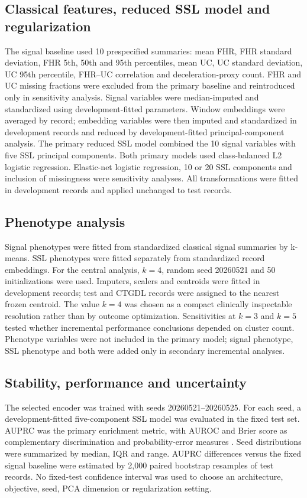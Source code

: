 \documentclass[utf8]{FrontiersinHarvard}
\begin{document}
\subsection{Classical features, reduced SSL model and regularization}

The signal baseline used 10 prespecified summaries: mean FHR, FHR standard deviation, FHR 5th, 50th and 95th percentiles, mean UC, UC standard deviation, UC 95th percentile, FHR--UC correlation and deceleration-proxy count. FHR and UC missing fractions were excluded from the primary baseline and reintroduced only in sensitivity analysis. Signal variables were median-imputed and standardized using development-fitted parameters. Window embeddings were averaged by record; embedding variables were then imputed and standardized in development records and reduced by development-fitted principal-component analysis. The primary reduced SSL model combined the 10 signal variables with five SSL principal components. Both primary models used class-balanced L2 logistic regression. Elastic-net logistic regression, 10 or 20 SSL components and inclusion of missingness were sensitivity analyses. All transformations were fitted in development records and applied unchanged to test records.

\subsection{Phenotype analysis}

Signal phenotypes were fitted from standardized classical signal summaries by k-means. SSL phenotypes were fitted separately from standardized record embeddings. For the central analysis, $k=4$, random seed 20260521 and 50 initializations were used. Imputers, scalers and centroids were fitted in development records; test and CTGDL records were assigned to the nearest frozen centroid. The value $k=4$ was chosen as a compact clinically inspectable resolution rather than by outcome optimization. Sensitivities at $k=3$ and $k=5$ tested whether incremental performance conclusions depended on cluster count. Phenotype variables were not included in the primary model; signal phenotype, SSL phenotype and both were added only in secondary incremental analyses.

\subsection{Stability, performance and uncertainty}

The selected encoder was trained with seeds 20260521--20260525. For each seed, a development-fitted five-component SSL model was evaluated in the fixed test set. AUPRC was the primary enrichment metric, with AUROC and Brier score as complementary discrimination and probability-error measures \citep{davis2006}. Seed distributions were summarized by median, IQR and range. AUPRC differences versus the fixed signal baseline were estimated by 2,000 paired bootstrap resamples of test records. No fixed-test confidence interval was used to choose an architecture, objective, seed, PCA dimension or regularization setting.
\end{document}
